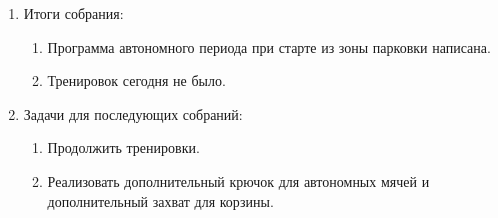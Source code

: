 \begin{enumerate}
\begin{enumerate}
	\end{enumerate}
	
	\item Итоги собрания:
	\begin{enumerate}
		
		\item Программа автономного периода при старте из зоны парковки написана.
		
		\item Тренировок сегодня не было.
		
	\end{enumerate}
	
	\item Задачи для последующих собраний:
	\begin{enumerate}
		
		\item Продолжить тренировки.
		
		\item Реализовать дополнительный крючок для автономных мячей и дополнительный захват для корзины.
			
	\end{enumerate}
\end{enumerate}
\fillpage
